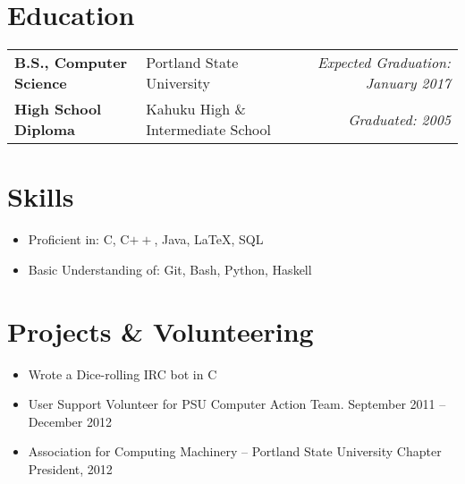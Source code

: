 \documentclass[letterpaper,12pt]{article}
\def\objective{Dedicated computer science student seeking internship in software development}
\newcommand{\education}{%
  \begin{tabular}{ llr }
}
\newcommand{\schoolentry}[3]{%
  \textbf{#1} & #2 & \emph{#3} \vspace{3pt} \\
}
\newcommand{\fineducation}{%
  \end{tabular}
}
\begin{document}


\section{Education}
  \education
    \schoolentry{B.S., Computer Science}{Portland State University}{Expected Graduation: January 2017}
    \schoolentry{High School Diploma}{Kahuku High \& Intermediate School}{Graduated: 2005}
  \fineducation

\section{Skills}
  \begin{itemize}
    \item Proficient in: C, C$++$, Java, \LaTeX, SQL
    \item Basic Understanding of: Git, Bash, Python, Haskell
  \end{itemize}

\section{Projects \& Volunteering}
  \begin{itemize}
    \item Wrote a Dice-rolling IRC bot in C
    \item User Support Volunteer for PSU Computer Action Team. September 2011 -- December 2012
    \item Association for Computing Machinery -- Portland State University Chapter President, 2012
  \end{itemize}
\end{document}
